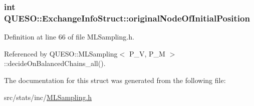 \hypertarget{struct_q_u_e_s_o_1_1_exchange_info_struct_a34d90724820b54a6e1ae0991b0ae987c}{
\subsubsection[{original\-Node\-Of\-Initial\-Position}]{\setlength{\rightskip}{0pt plus 5cm}int Q\-U\-E\-S\-O\-::\-Exchange\-Info\-Struct\-::original\-Node\-Of\-Initial\-Position}}\label{struct_q_u_e_s_o_1_1_exchange_info_struct_a34d90724820b54a6e1ae0991b0ae987c}


Definition at line 66 of file M\-L\-Sampling.\-h.



Referenced by Q\-U\-E\-S\-O\-::\-M\-L\-Sampling$<$ P\-\_\-\-V, P\-\_\-\-M $>$\-::decide\-On\-Balanced\-Chains\-\_\-all().



The documentation for this struct was generated from the following file\-:\begin{DoxyCompactItemize}
\item 
src/stats/inc/\hyperlink{_m_l_sampling_8h}{M\-L\-Sampling.\-h}\end{DoxyCompactItemize}
